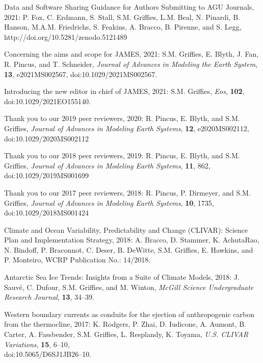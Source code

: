 \begin{etaremune}
\item Data and Software Sharing Guidance for Authors Submitting to AGU Journals, 2021: P. Fox, C. Erdmann, S. Stall, S.M. Grif\/f\/ies, L.M. Beal, N. Pinardi, B. Hanson, M.A.M. Friedrichs, S. Feakins, A. Bracco, B. Pirenne, and S. Legg,  http://doi.org/10.5281/zenodo.5121489

\item Concerning the aims and scope for JAMES, 2021: S.M. Grif\/f\/ies, E. Blyth, J. Fan, R. Pincus, and T. Schneider, {\it Journal of Advances in Modeling the Earth System}, {\bf 13},  e2021MS002567, doi:10.1029/2021MS002567.

\item Introducing the new editor in chief of JAMES, 2021: S.M. Grif\/f\/ies, {\it Eos}, {\bf 102}, doi:10.1029/2021EO155140. 

\item Thank you to our 2019 peer reviewers, 2020: R. Pincus, E. Blyth, and S.M. Grif\/f\/ies, {\it Journal of Advances in Modeling Earth Systems}, {\bf 12}, e2020MS002112, doi:10.1029/2020MS002112

\item Thank you to our 2018 peer reviewers, 2019: R. Pincus, E. Blyth, and S.M. Grif\/f\/ies, {\it Journal of Advances in Modeling Earth Systems}, {\bf 11}, 862, doi:10.1029/2019MS001699

\item  Thank you to our 2017 peer reviewers, 2018:  R. Pincus, P. Dirmeyer, and S.M. Grif\/f\/ies, {\it Journal of Advances in Modeling Earth Systems}, {\bf 10}, 1735, doi:10.1029/2018MS001424

\item Climate and Ocean Variability, Predictability and Change (CLIVAR): Science Plan and Implementation Strategy, 2018: A. Bracco, D. Stammer, K. AchutaRao, N. Bindoff, P. Braconnot, C. Deser, B. DeWitte, S.M. Grif\/f\/ies, E. Hawkins, and P. Monteiro, WCRP Publication No.: 14/2018. 

\item Antarctic Sea Ice Trends: Insights from a Suite of Climate Models, 2018: J. Sauv\'{e}, C. Dufour, S.M. Grif\/f\/ies, and M. Winton, {\it McGill Science Undergraduate Research Journal}, {\bf 13}, 34--39. 

\item Western boundary currents as conduits for the ejection of anthropogenic carbon from the thermocline, 2017: K. Rodgers, P. Zhai, D. Iudicone, A. Aumont, B. Carter, A. Fassbender, S.M. Grif\/f\/ies, L. Resplandy, K. Toyama, {\it U.S. CLIVAR Variations}, {\bf 15}, 6--10, \\ doi:10.5065/D6SJ1JB26--10.


\end{etaremune}
